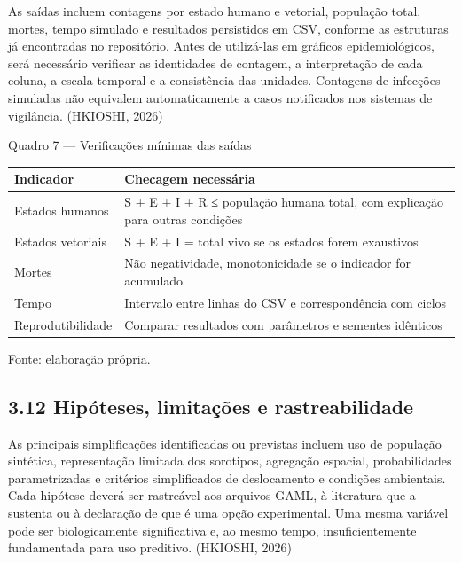 As saídas incluem contagens por estado humano e vetorial, população
total, mortes, tempo simulado e resultados persistidos em CSV, conforme
as estruturas já encontradas no repositório. Antes de utilizá-las em
gráficos epidemiológicos, será necessário verificar as identidades de
contagem, a interpretação de cada coluna, a escala temporal e a
consistência das unidades. Contagens de infecções simuladas não
equivalem automaticamente a casos notificados nos sistemas de
vigilância. (HKIOSHI, 2026)

Quadro 7 --- Verificações mínimas das saídas

\begin{longtable}[]{@{}
  >{\raggedright\arraybackslash}p{}
  >{\raggedright\arraybackslash}p{}@{}}
\toprule\noalign{}
\begin{minipage}[b]{\linewidth}\raggedright
\textbf{Indicador}
\end{minipage} & \begin{minipage}[b]{\linewidth}\raggedright
\textbf{Checagem necessária}
\end{minipage} \\
\midrule\noalign{}
\endhead
\bottomrule\noalign{}
\endlastfoot
Estados humanos & S + E + I + R ≤ população humana total, com explicação
para outras condições \\
Estados vetoriais & S + E + I = total vivo se os estados forem
exaustivos \\
Mortes & Não negatividade, monotonicidade se o indicador for
acumulado \\
Tempo & Intervalo entre linhas do CSV e correspondência com ciclos \\
Reprodutibilidade & Comparar resultados com parâmetros e sementes
idênticos \\
\end{longtable}

Fonte: elaboração própria.

\subsection{3.12 Hipóteses, limitações e
rastreabilidade}\label{hipuxf3teses-limitauxe7uxf5es-e-rastreabilidade}

As principais simplificações identificadas ou previstas incluem uso de
população sintética, representação limitada dos sorotipos, agregação
espacial, probabilidades parametrizadas e critérios simplificados de
deslocamento e condições ambientais. Cada hipótese deverá ser rastreável
aos arquivos GAML, à literatura que a sustenta ou à declaração de que é
uma opção experimental. Uma mesma variável pode ser biologicamente
significativa e, ao mesmo tempo, insuficientemente fundamentada para uso
preditivo. (HKIOSHI, 2026)

